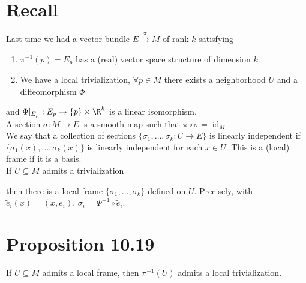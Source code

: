 \documentclass[11pt]{article}
\begin{document}
\section*{Recall}
\label{sec:orgafbd198}
Last time we had a vector bundle \(E\overset{\pi}{\to}M\) of rank \(k\) satisfying\\
\begin{enumerate}
\item \(\pi^{-1}(p)=E_{p}\) has a (real) vector space structure of dimension \(k\).\\
\item We have a local trivialization, \(\forall p\in M\) there exists a neighborhood \(U\) and a diffeomorphism \(\Phi\)\\
\end{enumerate}


and \(\Phi|_{E_{p}}:E_{p}\to\{p\}\times\R^{k}\) is a linear isomorphism.\\
A section \(\sigma:M\to E\) is a smooth map such that \(\pi\circ\sigma=\operatorname{id}_{M}\).\\
We say that a collection of sections \(\{\sigma_{1},\ldots,\sigma_{k}:U\to E\}\) is linearly independent if \(\{\sigma_{1}(x),\ldots,\sigma_{k}(x)\}\) is linearly independent for each \(x\in U\). This is a (local) frame if it is a basis.\\
If \(U\subseteq M\) admits a trivialization\\


then there is a local frame \(\{\sigma_{1},\ldots,\sigma_{k}\}\) defined on \(U\). Precisely, with \(\tilde{e}_{i}(x)=(x,e_{i})\), \(\sigma_{i}=\Phi^{-1}\circ\tilde{e}_{i}\).\\
\section*{Proposition 10.19}
\label{sec:orge2d1aa3}
If \(U\subseteq M\) admits a local frame, then \(\pi^{-1}(U)\) admits a local trivialization.\\
\end{document}
